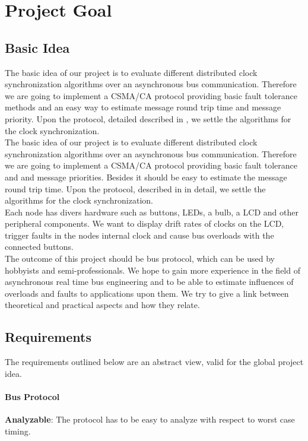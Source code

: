 \section{Project Goal}

\subsection{Basic Idea}
The basic idea of our project is to evaluate different distributed clock synchronization algorithms over an 
asynchronous bus communication. Therefore we are going to implement a CSMA/CA protocol providing basic fault 
tolerance methods and an easy way to estimate message round trip time and message priority.
Upon the protocol, detailed described in \cite[NESD2]{NESD2}, we settle the algorithms for the clock synchronization.\\

The basic idea of our project is to evaluate different distributed clock synchronization algorithms over an 
asynchronous bus communication. Therefore we are going to implement a CSMA/CA protocol providing basic fault 
tolerance and and message priorities. Besides it should be easy to estimate the message round trip time.
Upon the protocol, described in \cite[NESD2]{NESD2} in detail, we settle the algorithms for the clock synchronization.\\

Each node has divers hardware such as buttons, LEDs, a bulb, a LCD and other peripheral components. 
We want to display drift rates of clocks on the LCD, trigger faults in the nodes internal clock and  
cause bus overloads with the connected buttons.\\

The outcome of this project should be bus protocol, which can be used by hobbyists and semi-professionals. 
We hope to gain more experience in the field of asynchronous real time bus engineering and 
to be able to estimate influences of overloads and faults to applications upon them.
We try to give a link between theoretical and practical aspects and how they relate.


\subsection{Requirements}
The requirements outlined below are an abstract view, valid for the global project idea.

\paragraph{Bus Protocol}
\begin{req}
\label{req:ulftrtp:analyzeable}
\textbf{Analyzable}: The protocol has to be easy to analyze with respect to worst case timing.
\end{req}

